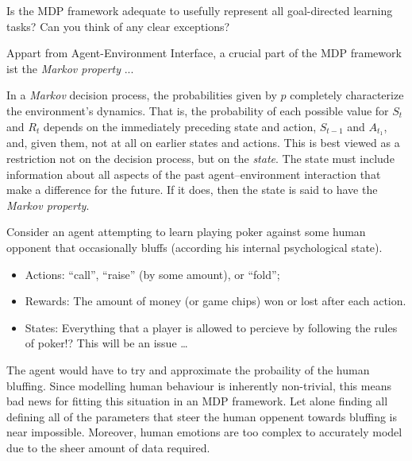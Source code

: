 
\begin{exercise}[Exercise 3.2]

Is the MDP framework adequate to usefully represent all goal-directed learning tasks?
Can you think of any clear exceptions?

\end{exercise}


\begin{solution}

Appart from Agent-Environment Interface, a crucial part of the MDP framework ist the \textit{Markov property} ...

\begin{displayquote}
    In a \textit{Markov} decision process, the probabilities given by $p$ completely characterize the environment's dynamics.
    That is, the probability of each possible value for $S_t$ and $R_t$ depends on the immediately preceding state and action, $S_{t-1}$ and $A_{t_1}$, and, given them, not at all on earlier states and actions.
    This is best viewed as a restriction not on the decision process, but on the \textit{state}.
    The state must include information about all aspects of the past agent–environment interaction that make a difference for the future.
    If it does, then the state is said to have the \textit{Markov property}.    
\end{displayquote}

Consider an agent attempting to learn playing poker against some human opponent that occasionally bluffs (according his internal psychological state).

\begin{itemize}
    \item Actions:
    \enquote{call}, \enquote{raise} (by some amount), or \enquote{fold};
    \item Rewards:
    The amount of money (or game chips) won or lost after each action.
    \item States:
    Everything that a player is allowed to percieve by following the rules of poker!?
    This will be an issue \dots
\end{itemize}

The agent would have to try and approximate the probaility of the human bluffing.
Since modelling human behaviour is inherently non-trivial, this means bad news for fitting this situation in an MDP framework.
Let alone finding all defining all of the parameters that steer the human oppenent towards bluffing is near impossible.
Moreover, human emotions are too complex to accurately model due to the sheer amount of data required.


\end{solution}
